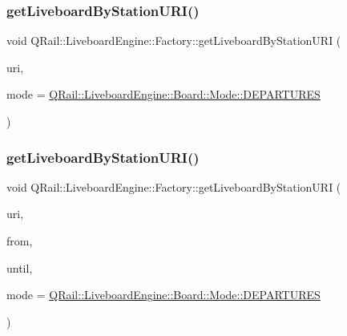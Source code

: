 \mbox{\label{classQRail_1_1LiveboardEngine_1_1Factory_adc3e3cb8c87171641f33f77367074a02}} 
\subsubsection{\texorpdfstring{getLiveboardByStationURI()}{getLiveboardByStationURI()}\hspace{0.1cm}{\footnotesize\ttfamily [1/2]}}
{\footnotesize\ttfamily void Q\+Rail\+::\+Liveboard\+Engine\+::\+Factory\+::get\+Liveboard\+By\+Station\+U\+RI (\begin{DoxyParamCaption}\item[{const Q\+Url \&}]{uri,  }\item[{const \mbox{\hyperlink{classQRail_1_1LiveboardEngine_1_1Board_a0ab6d318f405895f62c6e98cb2d86c6e}{Q\+Rail\+::\+Liveboard\+Engine\+::\+Board\+::\+Mode}} \&}]{mode = {\ttfamily \mbox{\hyperlink{classQRail_1_1LiveboardEngine_1_1Board_a0ab6d318f405895f62c6e98cb2d86c6ea560e6dfa758a32c703224545b841a386}{Q\+Rail\+::\+Liveboard\+Engine\+::\+Board\+::\+Mode\+::\+D\+E\+P\+A\+R\+T\+U\+R\+ES}}} }\end{DoxyParamCaption})}

\mbox{\label{classQRail_1_1LiveboardEngine_1_1Factory_a3fc799d424334fe21be54a3cba0853be}} 
\subsubsection{\texorpdfstring{getLiveboardByStationURI()}{getLiveboardByStationURI()}\hspace{0.1cm}{\footnotesize\ttfamily [2/2]}}
{\footnotesize\ttfamily void Q\+Rail\+::\+Liveboard\+Engine\+::\+Factory\+::get\+Liveboard\+By\+Station\+U\+RI (\begin{DoxyParamCaption}\item[{const Q\+Url \&}]{uri,  }\item[{const Q\+Date\+Time \&}]{from,  }\item[{const Q\+Date\+Time \&}]{until,  }\item[{const \mbox{\hyperlink{classQRail_1_1LiveboardEngine_1_1Board_a0ab6d318f405895f62c6e98cb2d86c6e}{Q\+Rail\+::\+Liveboard\+Engine\+::\+Board\+::\+Mode}} \&}]{mode = {\ttfamily \mbox{\hyperlink{classQRail_1_1LiveboardEngine_1_1Board_a0ab6d318f405895f62c6e98cb2d86c6ea560e6dfa758a32c703224545b841a386}{Q\+Rail\+::\+Liveboard\+Engine\+::\+Board\+::\+Mode\+::\+D\+E\+P\+A\+R\+T\+U\+R\+ES}}} }\end{DoxyParamCaption})}

